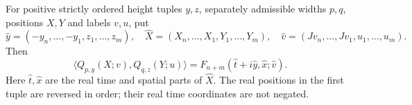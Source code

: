 \begin{lemma}\label{lem:mixed-heat-gram}
For positive strictly ordered height tuples $y,z$, separately admissible
widths $p,q$, positions $X,Y$ and labels $v,u$, put
\[
 \widehat y=(-y_n,\ldots,-y_1,z_1,\ldots,z_m),\quad
 \widehat X=(X_n,\ldots,X_1,Y_1,\ldots,Y_m),\quad
 \widehat v=(Jv_n,\ldots,Jv_1,u_1,\ldots,u_m).
\]
Then
\begin{equation}\label{eq:point-gram-continuation}
 \langle Q_{p,y}(X;v),Q_{q,z}(Y;u)\rangle
   =F_{n+m}(\widehat t+i\widehat y,\widehat x;\widehat v).
\end{equation}
Here $\widehat t,\widehat x$ are the real time and spatial parts of
$\widehat X$. The real positions in the first tuple are reversed in order;
their real time coordinates are not negated.
\end{lemma}
